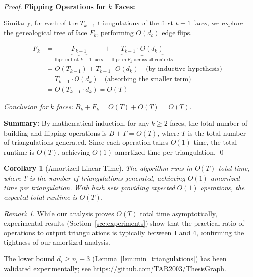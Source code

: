 ﻿﻿\documentclass[12pt,a4paper]{article}
\newtheorem{corollary}[theorem]{Corollary}
\theoremstyle{definition}
\theoremstyle{remark}
\newtheorem{remark}{Remark}
\begin{document}
\begin{proof}
	\textbf{Flipping Operations for $k$ Faces:}

	Similarly, for each of the $T_{k-1}$ triangulations of the first $k-1$ faces, we explore the genealogical tree of face $F_k$, performing $O(d_k)$ edge flips.

	\begin{align*}
		F_k & = \underbrace{F_{k-1}}_{\text{flips in first } k-1 \text{ faces}} + \underbrace{T_{k-1} \cdot O(d_k)}_{\text{flips in } F_k \text{ across all contexts}} \\
		    & = O(T_{k-1}) + T_{k-1} \cdot O(d_k) \quad \text{(by inductive hypothesis)}                                                                               \\
		    & = T_{k-1} \cdot O(d_k) \quad \text{(absorbing the smaller term)}                                                                                         \\
		    & = O(T_{k-1} \cdot d_k) = O(T)
	\end{align*}

	\textit{Conclusion for $k$ faces:} $B_k + F_k = O(T) + O(T) = O(T)$.

	\vspace{0.3cm}
	\noindent\textbf{Summary:} By mathematical induction, for any $k \geq 2$ faces, the total number of building and flipping operations is $B + F = O(T)$, where $T$ is the total number of triangulations generated. Since each operation takes $O(1)$ time, the total runtime is $O(T)$, achieving $O(1)$ amortized time per triangulation. \qed


\end{proof}

\begin{corollary}[Amortized Linear Time]
	\label{cor:linear_time}
	The algorithm runs in $O(T)$ total time, where $T$ is the number of triangulations generated, achieving $O(1)$ amortized time per triangulation. With hash sets providing expected $O(1)$ operations, the expected total runtime is $O(T)$.
\end{corollary}

\begin{remark}
	While our analysis proves $O(T)$ total time asymptotically, experimental results (Section~\ref{sec:experiments}) show that the practical ratio of operations to output triangulations is typically between 1 and 4, confirming the tightness of our amortized analysis.
\end{remark}

The lower bound $d_i \geq n_i - 3$ (Lemma~\ref{lem:min_triangulations}) has been validated experimentally; see \url{https://github.com/TAR2003/ThesisGraph}.
\end{document}
